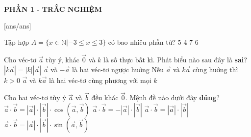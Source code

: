 
\begin{center}
	\textbf{PHẦN 1 - TRẮC NGHIỆM}
\end{center}
[ans/ans]
\begin{ex}%
	Tập hợp $A=\{x\in\mathbb{N}|-3\leq x\leq 3\}$ có bao nhiêu phần tử?
	\choice
	{$5$}
	{\True $4$}
	{$7$}
	{$6$}
\end{ex}
\begin{ex}%
	Cho véc-tơ $\vec{a}$ tùy ý, khác $\vec{0}$ và $k$ là số thực bất kì. Phát biểu nào sau đây là \textbf{sai}?
	\choice
	{$|k\vec{a}|=|k||\vec{a}|$}
	{$\vec{a}$ và $-\vec{a}$ là hai véc-tơ ngược huớng}
	{Nếu $\vec{a}$ và $k\vec{a}$ cùng huớng thì $k>0$}
	{\True $\vec{a}$ và $k\vec{a}$ là hai véc-tơ cùng phương với mọi $k$}
\end{ex}
\begin{ex}%
	Cho hai véc-tơ tùy ý $\vec{a}$ và $\vec{b}$ đều khác $\vec{0}$. Mệnh đề nào dưới đây \textbf{đúng}?
	\choice
	{\True $\vec{a}\cdot\vec{b}=|\vec{a}|\cdot|\vec{b}|\cdot\cos(\vec{a},\vec{b})$}
	{$\vec{a}\cdot\vec{b}=-|\vec{a}|\cdot|\vec{b}|$}
	{$\vec{a}\cdot\vec{b}=|\vec{a}|\cdot|\vec{b}|$}
	{$\vec{a}\cdot\vec{b}=|\vec{a}|\cdot|\vec{b}|\cdot\sin(\vec{a},\vec{b})$}
\end{ex}
